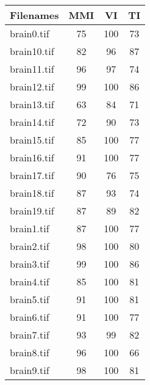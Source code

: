 \begin{tabular}{lccc}
\hline
 Filenames              & MMI & VI  & TI \\ \hline \hline
 brain0.tif  & 75  & 100 & 73 \\
 brain10.tif & 82  & 96  & 87 \\
 brain11.tif & 96  & 97  & 74 \\
 brain12.tif & 99  & 100 & 86 \\
 brain13.tif & 63  & 84  & 71 \\
 brain14.tif & 72  & 90  & 73 \\
 brain15.tif & 85  & 100 & 77 \\
 brain16.tif & 91  & 100 & 77 \\
 brain17.tif & 90  & 76  & 75 \\
 brain18.tif & 87  & 93  & 74 \\
 brain19.tif & 87  & 89  & 82 \\
 brain1.tif  & 87  & 100 & 77 \\
 brain2.tif  & 98  & 100 & 80 \\
 brain3.tif  & 99  & 100 & 86 \\
 brain4.tif  & 85  & 100 & 81 \\
 brain5.tif  & 91  & 100 & 81 \\
 brain6.tif  & 91  & 100 & 77 \\
 brain7.tif  & 93  & 99  & 82 \\
 brain8.tif  & 96  & 100 & 66 \\
 brain9.tif  & 98  & 100 & 81 \\
\hline
\end{tabular}